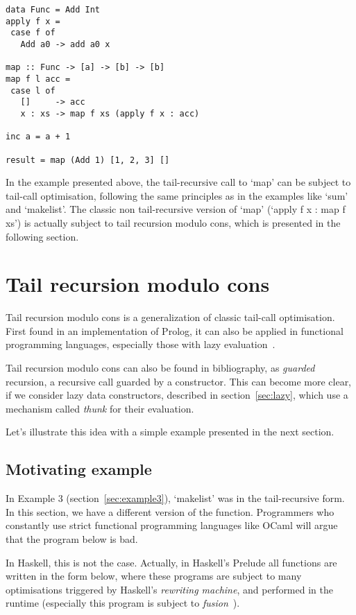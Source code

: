 \documentclass[diploma]{softlab-thesis}
\begin{document}
\begin{verbatim}
data Func = Add Int
apply f x =
 case f of
   Add a0 -> add a0 x

map :: Func -> [a] -> [b] -> [b]
map f l acc =
 case l of
   []     -> acc
   x : xs -> map f xs (apply f x : acc)

inc a = a + 1

result = map (Add 1) [1, 2, 3] []
\end{verbatim}
In the example presented above, 
the tail-recursive call to `map' can be subject to tail-call optimisation, 
following the same principles as in the examples like `sum' and `makelist'. The classic non tail-recursive 
version of `map' (`apply f x : map f xs') is actually subject to tail recursion modulo cons, which is presented 
in the following section.

\section{Tail recursion modulo cons}
\label{sec:modulo-cons-example}

Tail recursion modulo cons is a generalization of classic tail-call optimisation. First found in an 
implementation of Prolog, it can also be applied in
functional programming languages, especially those with lazy evaluation~\cite{Wadler84}.

Tail recursion modulo cons can also be found in bibliography, as \textit{guarded} recursion, 
a recursive call guarded by a constructor. This can become more clear, if we consider lazy data constructors, 
described in section~\ref{sec:lazy}, which use a mechanism called \textit{thunk} for their evaluation.

Let's illustrate this idea with a simple example presented in the next section.

\subsection {Motivating example}
In Example 3 (section~\ref{sec:example3}), `makelist' was in the tail-recursive 
form. In this section, we have a different version of the function. 
Programmers who constantly use strict functional programming languages like OCaml 
will argue that the program below is bad. 

In Haskell, this is not the case. Actually, in Haskell's Prelude all functions are written 
in the form below, where these programs are subject to many optimisations triggered 
by Haskell's \textit{rewriting machine}, and performed in the runtime 
(especially this program is subject to \textit{fusion}~\cite{Coutts07}). 
\end{document}
